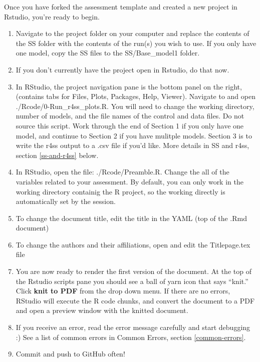 \documentclass[12pt,]{article}
\begin{document}
Once you have forked the assessment template and created a new project
in Rstudio, you're ready to begin.

\begin{enumerate}
\def\labelenumi{\arabic{enumi}.}
\item
  Navigate to the project folder on your computer and replace the
  contents of the SS folder with the contents of the run(s) you wish to
  use. If you only have one model, copy the SS files to the
  SS/Base\_model1 folder.
\item
  If you don't currently have the project open in Rstudio, do that now.
\item
  In RStudio, the project navigation pane is the bottom panel on the
  right, (contains tabs for Files, Plots, Packages, Help, Viewer).
  Navigate to and open ./Rcode/0-Run\_r4ss\_plots.R. You will need to
  change the working directory, number of models, and the file names of
  the control and data files. Do not source this script. Work through
  the end of Section 1 if you only have one model, and continue to
  Section 2 if you have mulitple models. Section 3 is to write the r4ss
  output to a .csv file if you'd like. More details in SS and r4ss,
  section \ref{ss-and-r4ss} below.
\item
  In RStudio, open the file: ./Rcode/Preamble.R. Change the all of the
  variables related to your assessment. By default, you can only work in
  the working directory containig the R project, so the working directly
  is automatically set by the session.
\item
  To change the document title, edit the title in the YAML (top of the
  .Rmd document)
\item
  To change the authors and their affiliations, open and edit the
  Titlepage.tex file
\item
  You are now ready to render the first version of the document. At the
  top of the Rstudio scripts pane you should see a ball of yarn icon
  that says ``knit.'' Click \textbf{knit to PDF} from the drop down
  menu. If there are no errors, RStudio will execute the R code chunks,
  and convert the document to a PDF and open a preview window with the
  knitted document.
\item
  If you receive an error, read the error message carefully and start
  debugging :) See a list of common errors in Common Errors, section
  \ref{common-errors}.
\item
  Commit and push to GitHub often!
\end{enumerate}
\end{document}

